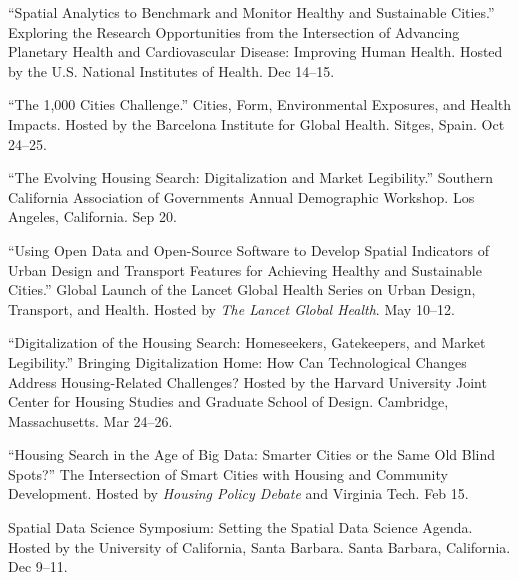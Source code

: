     \begin{tablist}

    \item[2023] \tab{}\enquote{Spatial Analytics to Benchmark and Monitor Healthy and Sustainable Cities.} Exploring the Research Opportunities from the Intersection of Advancing Planetary Health and Cardiovascular Disease: Improving Human Health. Hosted by the U.S. National Institutes of Health. Dec 14--15.

    \item[2023] \tab{}\enquote{The 1,000 Cities Challenge.} Cities, Form, Environmental Exposures, and Health Impacts. Hosted by the Barcelona Institute for Global Health. Sitges, Spain. Oct 24--25.

    \item[2023] \tab{}\enquote{The Evolving Housing Search: Digitalization and Market Legibility.} Southern California Association of Governments Annual Demographic Workshop. Los Angeles, California. Sep 20.

    \item[2022] \tab{}\enquote{Using Open Data and Open-Source Software to Develop Spatial Indicators of Urban Design and Transport Features for Achieving Healthy and Sustainable Cities.} Global Launch of the Lancet Global Health Series on Urban Design, Transport, and Health. Hosted by \textit{The Lancet Global Health}. May 10--12.

    \item[2022] \tab{}\enquote{Digitalization of the Housing Search: Homeseekers, Gatekeepers, and Market Legibility.} Bringing Digitalization Home: How Can Technological Changes Address Housing-Related Challenges? Hosted by the Harvard University Joint Center for Housing Studies and Graduate School of Design. Cambridge, Massachusetts. Mar 24--26.

    \item[2021] \tab{}\enquote{Housing Search in the Age of Big Data: Smarter Cities or the Same Old Blind Spots?} The Intersection of Smart Cities with Housing and Community Development. Hosted by \textit{Housing Policy Debate} and Virginia Tech. Feb 15.

    \item[2019] \tab{}Spatial Data Science Symposium: Setting the Spatial Data Science Agenda. Hosted by the University of California, Santa Barbara. Santa Barbara, California. Dec 9--11.

    \end{tablist}


